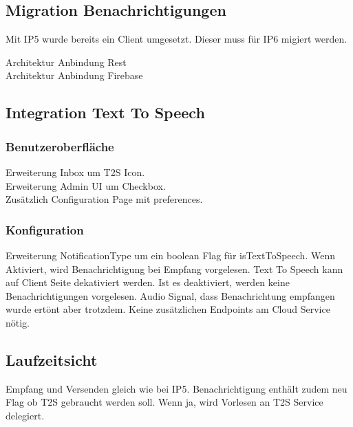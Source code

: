 \subsection{Migration Benachrichtigungen}

Mit IP5 wurde bereits ein Client umgesetzt.
Dieser muss für IP6 migiert werden.

Architektur Anbindung Rest \\
Architektur Anbindung Firebase \\

\clearpage


\subsection{Integration Text To Speech}

\subsubsection*{Benutzeroberfläche}

Erweiterung Inbox um T2S Icon. \\
Erweiterung Admin UI um Checkbox. \\
Zusätzlich Configuration Page mit preferences. \\

\subsubsection*{Konfiguration}
Erweiterung NotificationType um ein boolean Flag für isTextToSpeech.
Wenn Aktiviert, wird Benachrichtigung bei Empfang vorgelesen.
Text To Speech kann auf Client Seite dekativiert werden.
Ist es deaktiviert, werden keine Benachrichtigungen vorgelesen.
Audio Signal, dass Benachrichtung empfangen wurde ertönt aber trotzdem.
Keine zusätzlichen Endpoints am Cloud Service nötig. \\


\subsection*{Laufzeitsicht}

Empfang und Versenden gleich wie bei IP5.
Benachrichtigung enthält zudem neu Flag ob T2S gebraucht werden soll.
Wenn ja, wird Vorlesen an T2S Service delegiert.

